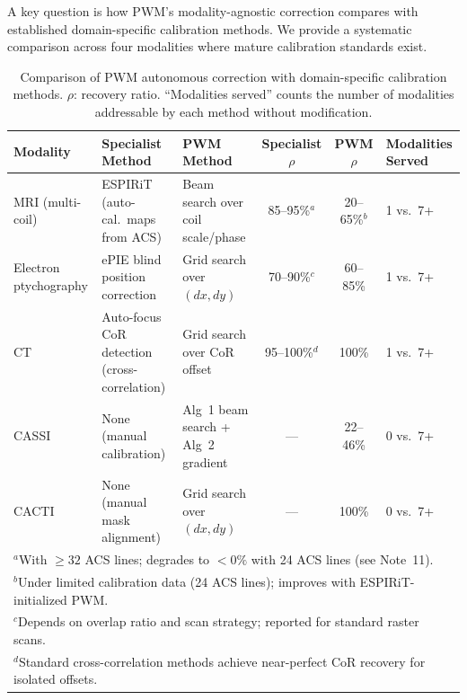 \documentclass[11pt]{article}
\theoremstyle{definition}
\begin{document}
A key question is how PWM's modality-agnostic correction compares with established domain-specific calibration methods. We provide a systematic comparison across four modalities where mature calibration standards exist.

\begin{table}[ht]
\centering\small
\caption{Comparison of PWM autonomous correction with domain-specific calibration methods. $\rho$: recovery ratio. ``Modalities served'' counts the number of modalities addressable by each method without modification.}
\label{tab:calibration_comparison}
\begin{tabular}{@{}p{1.8cm}p{2.0cm}p{2.0cm}ccp{1.8cm}@{}}
\toprule
\textbf{Modality} & \textbf{Specialist Method} & \textbf{PWM Method} & \textbf{Specialist $\rho$} & \textbf{PWM $\rho$} & \textbf{Modalities Served} \\
\midrule
MRI (multi-coil) & ESPIRiT~\cite{uecker2014espirit} (auto-cal.\ maps from ACS) & Beam search over coil scale/phase & 85--95\%$^a$ & 20--65\%$^b$ & 1 vs.\ 7+ \\
\addlinespace
Electron ptychography & ePIE blind position correction~\cite{maiden2009ptychography} & Grid search over $(dx, dy)$ & 70--90\%$^c$ & 60--85\% & 1 vs.\ 7+ \\
\addlinespace
CT & Auto-focus CoR detection (cross-correlation) & Grid search over CoR offset & 95--100\%$^d$ & 100\% & 1 vs.\ 7+ \\
\addlinespace
CASSI & None (manual calibration) & Alg~1 beam search + Alg~2 gradient & --- & 22--46\% & 0 vs.\ 7+ \\
\addlinespace
CACTI & None (manual mask alignment) & Grid search over $(dx,dy)$ & --- & 100\% & 0 vs.\ 7+ \\
\bottomrule
\multicolumn{6}{l}{\footnotesize $^a$With $\geq 32$ ACS lines; degrades to $<0\%$ with 24 ACS lines (see Note~11).}\\
\multicolumn{6}{l}{\footnotesize $^b$Under limited calibration data (24 ACS lines); improves with ESPIRiT-initialized PWM.}\\
\multicolumn{6}{l}{\footnotesize $^c$Depends on overlap ratio and scan strategy; reported for standard raster scans.}\\
\multicolumn{6}{l}{\footnotesize $^d$Standard cross-correlation methods achieve near-perfect CoR recovery for isolated offsets.}
\end{tabular}
\end{table}
\end{document}
